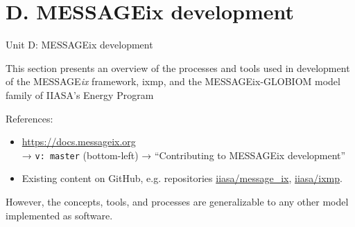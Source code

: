 \documentclass[12pt,aspectratio=169]{beamer}
\begin{document}
\section*{D. MESSAGEix development}
\begin{frame}{Unit D: MESSAGEix development}

This section presents an overview of the processes and tools used in development of the MESSAGE\emph{ix} framework, ixmp, and the MESSAGEix-GLOBIOM model family of IIASA's Energy Program

\medskip
References:
\begin{itemize}
  \item \url{https://docs.messageix.org} \\
    → \texttt{v: master} (bottom-left) → “Contributing to MESSAGEix development”

  \item Existing content on GitHub, e.g. repositories
    \href{https://github.com/iiasa/message_ix}{\ttfamily iiasa/message\_ix},
    \href{https://github.com/iiasa/ixmp}{\ttfamily iiasa/ixmp}.
\end{itemize}

\medskip
However, the concepts, tools, and processes are generalizable to any other model implemented as software.

%
%
%
%

\end{frame}
\end{document}
